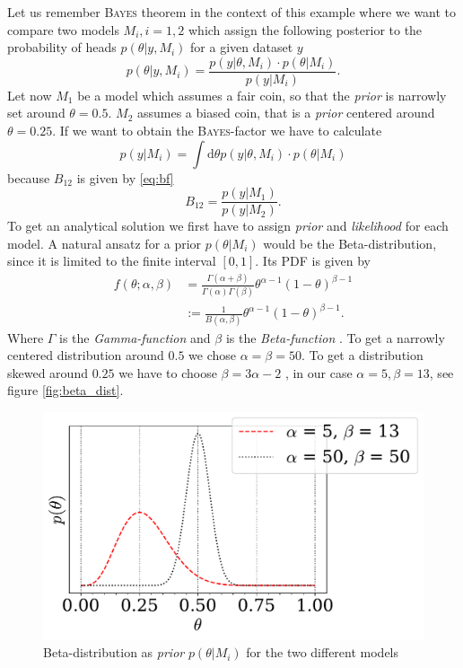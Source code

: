 \documentclass[%
 reprint,
 amsmath,amssymb,
 aps,
]{revtex4-1}
\begin{document}
Let us remember \textsc{Bayes} theorem in the context of this example where we want to compare two models $M_i,i=1,2$ which assign the following posterior to the probability of heads $p(\theta|y,M_i)$ for a given dataset $y$
$$p(\theta|y,M_i)=\frac{p(y|\theta,M_i)\cdot p(\theta|M_i)}{p(y|M_i)}.$$
Let now $M_1$ be a model which assumes a fair coin, so that the \emph{prior} is narrowly set around $\theta=0.5$. $M_2$ assumes a biased coin, that is a \emph{prior} centered around $\theta =0.25$. If we want to obtain the \textsc{Bayes}-factor we have to calculate $$p(y|M_i)=\int \text{d}\theta p(y|\theta,M_i)\cdot p(\theta|M_i) $$
because $B_{12}$ is given by \eqref{eq:bf} $$B_{12}=\frac{p(y|M_1)}{p(y|M_2)}.$$
To get an analytical solution we first have to assign \emph{prior} and \emph{likelihood} for each model. A natural ansatz for a prior $p(\theta|M_i)$ would be the Beta-distribution, since it is limited to the finite interval $[0,1]$. Its PDF is given by \cite{kormaz} \begin{align*}f(\theta;\alpha,\beta)&=\frac{\Gamma(\alpha+\beta)}{\Gamma(\alpha)\Gamma(\beta)}\theta^{\alpha-1}(1-\theta)^{\beta-1}\\&:=\frac{1}{B(\alpha,\beta)}\theta^{\alpha-1}(1-\theta)^{\beta-1}.
\end{align*}
Where $\Gamma$ is the \emph{Gamma-function} \cite{gamma_function} and $\beta$ is the \emph{Beta-function} \cite{beta_function}.
To get a narrowly centered distribution around $0.5$ we chose $\alpha=\beta=50$. To get a distribution skewed around $0.25$ we have to choose $\beta=3\alpha-2$ \cite{wiki}, in our case $\alpha=5,\beta=13$, see figure \eqref{fig:beta_dist}.
\begin{figure}[htbp]
	\centering
	\includegraphics[width=\linewidth]{beta_dist}
	\caption{Beta-distribution as \emph{prior} $p(\theta|M_i)$ for the two different models}
	\label{fig:beta_dist}
\end{figure}
\end{document}
